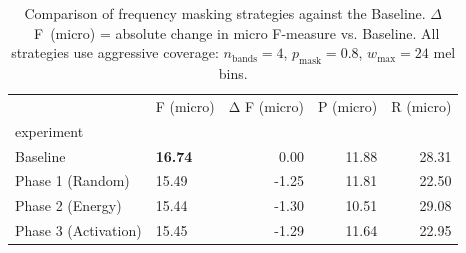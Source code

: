 \begin{table}
\centering
\caption{Comparison of frequency masking strategies against the Baseline. $\Delta$~F~(micro) = absolute change in micro F-measure vs. Baseline. All strategies use aggressive coverage: $n_{\text{bands}}=4$, $p_{\text{mask}}=0.8$, $w_{\text{max}}=24$ mel bins.}
\label{tab:masking_phases}
\begin{tabular}{llrrr}
\toprule
{} &       F (micro) &  Δ F (micro) &  P (micro) &  R (micro) \\
experiment           &                 &              &            &            \\
\midrule
Baseline             &  \textbf{16.74} &         0.00 &      11.88 &      28.31 \\
Phase 1 (Random)     &           15.49 &        -1.25 &      11.81 &      22.50 \\
Phase 2 (Energy)     &           15.44 &        -1.30 &      10.51 &      29.08 \\
Phase 3 (Activation) &           15.45 &        -1.29 &      11.64 &      22.95 \\
\bottomrule
\end{tabular}
\end{table}
